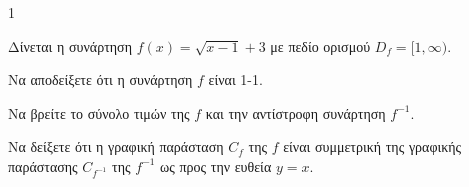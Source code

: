 \begin{ylh}{1}
    \item [Συναρτήσεις]
\end{ylh}

Δίνεται η συνάρτηση $f(x) = \sqrt{x-1} + 3$ με πεδίο ορισμού $D_f = [1, \infty)$.
\begin{alist}
\item Να αποδείξετε ότι η συνάρτηση $f$ είναι 1-1.
\item Να βρείτε το σύνολο τιμών της $f$ και την αντίστροφη συνάρτηση $f^{-1}$.
\item Να δείξετε ότι η γραφική παράσταση $C_f$ της $f$ είναι συμμετρική της γραφικής παράστασης $C_{f^{-1}}$ της $f^{-1}$ ως προς την ευθεία $y=x$.
\end{alist}